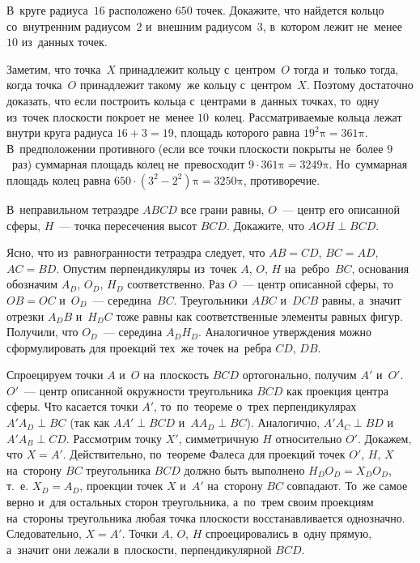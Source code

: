 \begin{problems}

\item
В~круге радиуса~$16$ расположено $650$ точек.
Докажите, что найдется кольцо со~внутренним радиусом~$2$ и~внешним
радиусом~$3$, в~котором лежит не~менее $10$ из~данных точек.

\end{problems}

\ifincludesolutions
Заметим, что точка~$X$ принадлежит кольцу с~центром~$O$ тогда и~только тогда,
когда точка~$O$ принадлежит такому~же кольцу с~центром~$X$.
Поэтому достаточно доказать, что если построить кольца с~центрами в~данных
точках, то~одну из~точек плоскости покроет не~менее $10$~колец.
Рассматриваемые кольца лежат внутри круга радиуса $16 + 3 = 19$, площадь
которого равна $19^2 \mathrm{\pi} = 361 \mathrm{\pi}$.
В~предположении противного (если все точки плоскости покрыты не~более $9$~раз)
суммарная площадь колец не~превосходит
$9 \cdot 361 \mathrm{\pi} = 3249 \mathrm{\pi}$.
Но~суммарная площадь колец равна
$650 \cdot (3^2 - 2^2) \mathrm{\pi} = 3250 \mathrm{\pi}$, противоречие.
\fi %

\begin{problems}

\item
В~неправильном тетраэдре $ABCD$ все грани равны, $O$~— центр его описанной
сферы, $H$~— точка пересечения высот $BCD$.
Докажите, что $AOH \perp BCD$.

\end{problems}

\ifincludesolutions
Ясно, что из~равногранности тетраэдра следует, что $AB = CD$, $BC = AD$,
$AC = BD$.
Опустим перпендикуляры из~точек $A$, $O$, $H$ на~ребро~$BC$, основания
обозначим $A_D$, $O_D$, $H_D$ соответственно.
Раз $O$~— центр описанной сферы, то~$OB = OC$ и~$O_D$~— середина~$BC$.
Треугольники $ABC$ и~$DCB$ равны, а~значит отрезки $A_D B$ и~$H_D C$ тоже равны
как соответственные элементы равных фигур.
Получили, что $O_D$~— середина $A_D H_D$.
Аналогичное утверждения можно сформулировать для проекций тех~же точек
на~ребра $CD$, $DB$.
\par
Спроецируем точки $A$ и~$O$ на~плоскость $BCD$ ортогонально, получим
$A'$ и~$O'$.
$O'$~— центр описанной окружности треугольника $BCD$ как проекция центра
сферы.
Что касается точки $A'$, то~по~теореме о~трех перпендикулярах $A' A_D \perp BC$
(так как $AA' \perp BCD$ и~$A A_D \perp BC$).
Аналогично, $A' A_C \perp BD$ и~$A' A_B \perp CD$.
Рассмотрим точку $X'$, симметричную $H$ относительно $O'$.
Докажем, что $X = A'$.
Действительно, по~теореме Фалеса для проекций точек $O'$, $H$, $X$ на~сторону
$BC$ треугольника $BCD$ должно быть выполнено $H_DO_D = X_DO_D$, т.~е.
$X_D = A_D$, проекции точек $X$ и~$A'$ на~сторону $BC$ совпадают.
То~же самое верно и~для остальных сторон треугольника, а~по~трем своим
проекциям на~стороны треугольника любая точка плоскости восстанавливается
однозначно.
Следовательно, $X = A'$.
Точки $A$, $O$, $H$ спроецировались в~одну прямую, а~значит они лежали в~плоскости, перпендикулярной $BCD$.
\fi %

